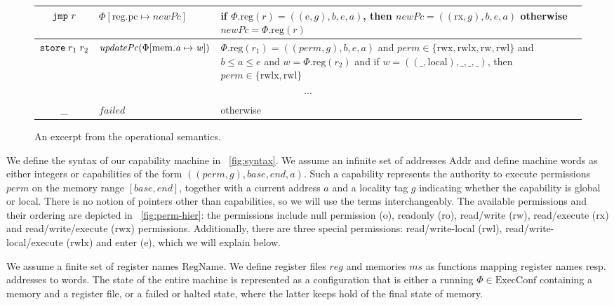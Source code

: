 \documentclass[compsoc,conference,letterpaper,fleqn]{IEEEtran}
\newcommand{\update}[2]{[#1 \mapsto #2]}
\newcommand\lau[1]{{\color{purple} \sf \footnotesize {LS: #1}}\\}
\renewcommand\lau[1]{}
\newcommand{\var}[1]{\mathit{#1}}
\newcommand{\hs}{\var{ms}}
\newcommand{\ms}{\hs}
\newcommand{\lv}{\var{r}}
\newcommand{\gl}{\var{g}}
\newcommand{\pcreg}{\mathrm{pc}}
\newcommand{\addr}{\var{a}}
\newcommand{\start}{\var{b}}
\newcommand{\addrend}{\var{e}}
\newcommand{\reg}{\var{reg}}
\newcommand{\perm}{\var{perm}}
\newcommand{\stdcap}[1][(\perm,\gl)]{\left(#1,\start,\addrend,\addr \right)}
\newcommand{\plainproj}[1]{\mathrm{#1}}
\newcommand{\memreg}[1][\Phi]{#1.\plainproj{reg}}
\newcommand{\updateHeap}[3][\Phi]{#1\update{\plainproj{mem}.#2}{#3}}
\newcommand{\updateReg}[3][\Phi]{#1\update{\plainproj{reg}.#2}{#3}}
\newcommand{\failed}{\mathit{failed}}
\newcommand{\plainfun}[2]{
  \ifthenelse{\equal{#2}{}}
  {\mathit{#1}}
  {\mathit{#1}(#2)}
}
\newcommand{\stdUpdatePc}[1]{\plainfun{updatePc}{#1}}
\newcommand{\plaindom}[1]{\mathrm{#1}}
\newcommand{\Addrs}{\plaindom{Addr}}
\newcommand{\ExecConfs}{\plaindom{ExecConf}}
\newcommand{\RegName}{\plaindom{RegName}}
\newcommand{\refreg}[1]{#1}
\newcommand{\refheap}[1]{#1}
\newcommand{\zinstr}[1]{\mathtt{#1}}
\newcommand{\oneinstr}[2]{
  \ifthenelse{\equal{#2}{}}
  {\zinstr{#1}}
  {\zinstr{#1} \; #2}
}
\newcommand{\jmp}[1]{\oneinstr{jmp}{#1}}
\newcommand{\twoinstr}[3]{
  \ifthenelse{\equal{#2#3}{}}
  {\zinstr{#1}}
  {\zinstr{#1} \; #2 \; #3}
}
\newcommand{\store}[2]{\twoinstr{store}{#1}{#2}}
\newcommand{\plainperm}[1]{\mathrm{#1}}
\newcommand{\noperm}{\plainperm{o}}
\newcommand{\readonly}{\plainperm{ro}}
\newcommand{\readwrite}{\plainperm{rw}}
\newcommand{\exec}{\plainperm{rx}}
\newcommand{\entry}{\plainperm{e}}
\newcommand{\rwx}{\plainperm{rwx}}
\newcommand{\readwritel}{\plainperm{rwl}}
\newcommand{\rwlx}{\plainperm{rwlx}}
\newcommand{\local}{\plainperm{local}}
\begin{document}
\begin{figure}
\begin{tabular}{|c|p{4.3cm}|p{9.9cm}|}
    \hline
    $\jmp{\lv}$&$\updateReg{\pcreg}{\var{newPc}}$& \footnotesize{if }$\memreg(r) = ((\entry,\gl),\start,\addrend,\addr)$\footnotesize{, then} $\var{newPc} = ((\exec,\gl),\start,\addrend,\addr)$\newline
    \footnotesize{otherwise }$\var{newPc} = \memreg(r)$\\
    \hline
    $\store{\refheap{r_1}}{\refreg{r_2}}$&$\stdUpdatePc{\updateHeap{\addr}{\var{w}}}$&$\memreg(r_1) = \stdcap$\footnotesize{ and }$\perm \in \{ \rwx, \rwlx, \readwrite, \readwritel\}$ \footnotesize{ and } $\start \leq \addr \leq \addrend$\footnotesize{ and }$\var{w} = \memreg(r_2)$
                                                                                       \footnotesize{and if }$\var{w} = ((\_,\local),\_,\_,\_)$\footnotesize{, then  }$\perm \in \{\rwlx,\readwritel \}$\\
    \hline
    \multicolumn{3}{|c|}{$\cdots$}\\
    \hline
    \_&$\failed$&\footnotesize{otherwise}\\
    \hline
  \end{tabular}
  \caption{An excerpt from the operational semantics.}
  \label{fig:op-sem}
\end{figure}

We define the syntax of our capability machine in \figurename~\ref{fig:syntax}.
We assume an infinite set of addresses $\Addrs$ and define machine words as
either integers or capabilities of the form
$((\perm,\gl),\var{base},\var{end},\addr)$. Such a capability represents the
authority to execute permissions $\perm$ on the memory range
$[\var{base},\var{end}]$, together with a current address $\addr$ and a locality tag
$\gl$ indicating whether the capability is global or local. There is no notion
of pointers other than capabilities, so we will use the terms interchangeably.
The available permissions and their ordering are depicted in
\figurename~\ref{fig:perm-hier}: the permissions include null permission
($\noperm$), readonly ($\readonly$), read/write ($\readwrite$), read/execute
($\exec$) and read/write/execute ($\rwx$) permissions. Additionally, there are
three special permissions: read/write-local ($\readwritel$), read/write-local/execute
($\rwlx$) and enter ($\entry$), which we will explain below.

We assume a finite set of register names $\RegName$. We define register files
$\reg$ and memories $\ms$ as functions mapping register names resp. addresses to
words. The state of the entire machine is represented as a configuration that is
either a running $\Phi \in \ExecConfs$ containing a memory and a register file,
or a failed or halted state, where the latter keeps hold of the final state of
memory.
\end{document}
